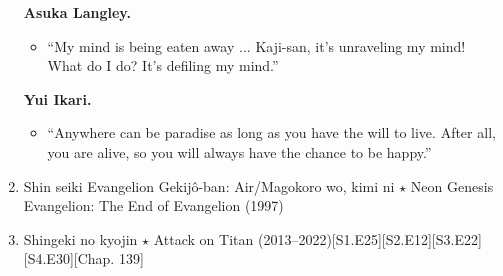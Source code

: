 \documentclass{article}
\begin{document}
\begin{enumerate}
	\textbf{Asuka Langley.}
	\begin{itemize}
		\item ``My mind is being eaten away $\ldots$ Kaji-san, it's unraveling my mind! What do I do? It's defiling my mind.''
	\end{itemize}
	\textbf{Yui Ikari.}
	\begin{itemize}
		\item ``Anywhere can be paradise as long as you have the will to live. After all, you are alive, so you will always have the chance to be happy.''
	\end{itemize}
    \item {\sc Shin seiki Evangelion Gekijô-ban: Air/Magokoro wo, kimi ni $\star$ Neon Genesis Evangelion: The End of Evangelion} (1997)
    \item {\sc Shingeki no kyojin $\star$ Attack on Titan} (2013--2022)\hfill[S1.E25][S2.E12][S3.E22][S4.E30][Chap. 139]
    

\end{enumerate}
\end{document}
